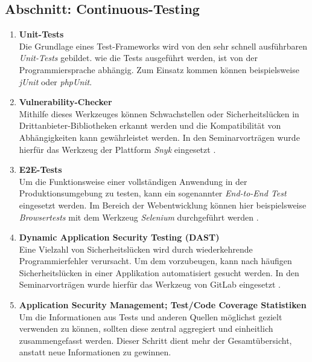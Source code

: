 \subsection{Abschnitt: Continuous-Testing}
\begin{enumerate}[resume]
    \itemsep-0.5em 
    \item \textbf{Unit-Tests}\label{Unit-Tests} \\
        Die Grundlage eines Test-Frameworks wird von den sehr schnell ausführbaren \emph{Unit-Tests} gebildet. wie die Tests ausgeführt werden, ist von der Programmiersprache abhängig. Zum Einsatz kommen können beispielsweise \emph{jUnit} oder \emph{phpUnit}.
    \item \textbf{Vulnerability-Checker}\label{Vulnerability-Checker} \\
        Mithilfe dieses Werkzeuges können Schwachstellen oder Sicherheitslücken in Drittan\-bieter-Bibliotheken erkannt werden und die Kompatibilität von Abhängigkeiten kann gewährleistet werden. In den Seminarvorträgen wurde hierfür das Werkzeug der Plattform \emph{Snyk} eingesetzt \cite{snykOpenSourceSecurity}.
    \item \textbf{E2E-Tests}\label{E2E-Tests} \\
        Um die Funktionsweise einer vollständigen Anwendung in der Produktionsumgebung zu testen, kann ein sogenannter \emph{End-to-End Test} eingesetzt werden. 
        Im Bereich der Webentwicklung können hier beispielsweise \emph{Browsertests} mit dem Werkzeug \emph{Selenium} durchgeführt werden \cite{seleniumSeleniumAutomatesBrowsers}.
    \item \textbf{Dynamic Application Security Testing (DAST)}\label{DAST} \\
        Eine Vielzahl von Sicherheitslücken wird durch wiederkehrende Programmierfehler verursacht. Um dem vorzubeugen, kann nach häufigen Sicherheitslücken in einer Applikation automatisiert gesucht werden. In den Seminarvorträgen wurde hierfür das Werkzeug von GitLab eingesetzt \cite{gitlabDynamicApplicationSecurity}.
    \item \textbf{Application Security Management; Test/Code Coverage Statistiken}\label{Test/Code Coverage Statistiken} \\
        Um die Informationen aus Tests und anderen Quellen möglichst gezielt verwenden zu können, sollten diese zentral aggregiert und einheitlich zusammengefasst werden. 
        Dieser Schritt dient mehr der Gesamtübersicht, anstatt neue Informationen zu gewinnen.
\end{enumerate}

